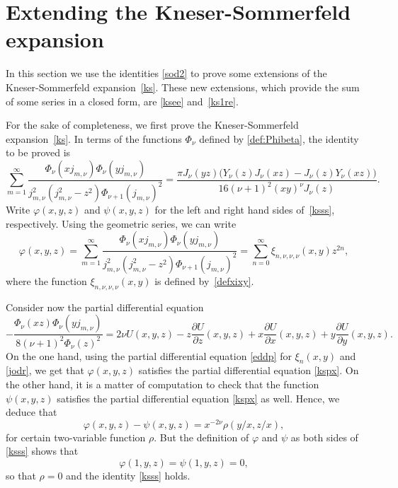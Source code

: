 \documentclass[10pt,leqno,a4paper]{article}
\theoremstyle{plain}
\numberwithin{equation}{section}
\begin{document}
\section{Extending the Kneser-Sommerfeld expansion}
\label{ksex}

In this section we use the identities \eqref{sod2} to prove some extensions of the Kneser-Sommerfeld expansion~\eqref{ks}. These new extensions, which provide the sum of some series in a closed form, are \eqref{ksee} and~\eqref{ks1re}.

For the sake of completeness, we first prove the Kneser-Sommerfeld expansion~\eqref{ks}.
In terms of the functions $\Phi_\nu$ defined by \eqref{def:Phibeta}, the identity to be proved is
\begin{equation}
\label{ksss}
   \sum_{m=1}^\infty
   \frac{\Phi_\nu(x j_{m,\nu})\Phi_\nu(y j_{m,\nu})}
   {j_{m,\nu}^2(j_{m,\nu}^{2}-z^2) \Phi_{\nu+1}(j_{m,\nu})^2}
   =
   \frac{\pi J_\nu(y z) \big(Y_\nu(z)J_\nu(xz)-J_{\nu}(z)Y_\nu(xz)\big)}
   {16(\nu+1)^2 (xy)^{\nu} J_\nu(z)}.
\end{equation}
Write $\varphi(x,y,z)$ and $\psi(x,y,z)$ for the left and right hand sides of~\eqref{ksss}, respectively. Using the geometric series, we can write
\[
   \varphi(x,y,z)
   = \sum_{m=1}^\infty
   \frac{\Phi_\nu(x j_{m,\nu})\Phi_\nu(y j_{m,\nu})}
   {j_{m,\nu}^{2} (j_{m,\nu}^{2}-z^2) \Phi_{\nu+1}(j_{m,\nu})^2}
   = \sum_{n=0}^\infty \xi_{n,\nu,\nu,\nu}(x,y) z^{2n},
\]
where the function $\xi_{n,\nu,\nu,\nu}(x,y)$ is defined by~\eqref{defxixy}.

Consider now the partial differential equation
\begin{equation}
\label{kspx}
   - \frac{\Phi_\nu(xz)\Phi_\nu(y j_{m,\nu})}{8(\nu+1)^2\Phi_\nu(z)^2}
   = 2\nu U(x,y,z) - z \frac{\partial U}{\partial z}(x,y,z)
   + x \frac{\partial U}{\partial x}(x,y,z)
   + y \frac{\partial U}{\partial y}(x,y,z).
\end{equation}
On the one hand, using the partial differential equation \eqref{eddp} for $\xi_n(x,y)$ and \eqref{jodr}, we get that $\varphi(x,y,z)$ satisfies the partial differential equation \eqref{kspx}. On the other hand, it is a matter of computation to check that the function $\psi(x,y,z)$ satisfies the partial differential equation \eqref{kspx} as well.
Hence, we deduce that
\[
   \varphi(x,y,z) - \psi(x,y,z) = x^{-2\nu} \rho(y/x,z/x),
\]
for certain two-variable function $\rho$. But the definition of $\varphi$ and $\psi$ as both sides of \eqref{ksss} shows that
\[
   \varphi(1,y,z) = \psi(1,y,z) = 0,
\]
so that $\rho=0$ and the identity \eqref{ksss} holds.
\end{document}
